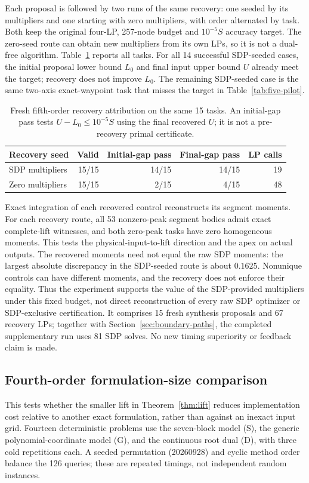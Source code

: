 \documentclass[pdflatex,sn-mathphys-num]{sn-jnl}
\theoremstyle{thmstyleone}
\theoremstyle{thmstyletwo}\newtheorem{remark}[theorem]{Remark}
\begin{document}
Each proposal is followed by two runs of the same recovery: one seeded by
its multipliers and one starting with zero multipliers, with order alternated
by task. Both keep the original four-LP, 257-node budget and
$10^{-5}S$ accuracy target. The zero-seed route can obtain new multipliers
from its own LPs, so it is not a dual-free algorithm.
Table~\ref{tab:five-attribution} reports all tasks. For all 14 successful
SDP-seeded cases, the initial proposal lower bound $L_0$ and final input
upper bound $U$ already meet the target; recovery does not improve $L_0$.
The remaining SDP-seeded case is the same two-axis exact-waypoint task
that misses the target in Table~\ref{tab:five-pilot}.
\begin{table}[htbp]
\centering\small
\caption{Fresh fifth-order recovery attribution on the same 15 tasks.
An initial-gap pass tests $U-L_0\le10^{-5}S$ using the final recovered $U$;
it is not a pre-recovery primal certificate.}
\label{tab:five-attribution}
\begin{tabular}{lrrrr}
\toprule
Recovery seed & Valid & Initial-gap pass & Final-gap pass & LP calls\\
\midrule
SDP multipliers &15/15&14/15&14/15&19\\
Zero multipliers &15/15&2/15&4/15&48\\
\bottomrule
\end{tabular}
\end{table}

Exact integration of each recovered control reconstructs its segment moments.
For each recovery route, all 53 nonzero-peak segment bodies admit exact
complete-lift witnesses, and both zero-peak tasks have zero homogeneous
moments. This tests the physical-input-to-lift direction and the apex on
actual outputs. The recovered moments need not equal the raw SDP moments:
the largest absolute discrepancy in the SDP-seeded route is about $0.1625$.
Nonunique controls can have different moments, and the recovery does not
enforce their equality. Thus the experiment supports the value of the
SDP-provided multipliers under this fixed budget, not direct reconstruction
of every raw SDP optimizer or SDP-exclusive certification. It comprises
15 fresh synthesis proposals and 67 recovery LPs; together with
Section~\ref{sec:boundary-paths}, the completed supplementary run uses 81 SDP
solves. No new timing superiority or feedback claim is made.

\subsection{Fourth-order formulation-size comparison}\label{sec:matched}
This tests whether the smaller lift in Theorem~\ref{thm:lift} reduces
implementation cost relative to another exact formulation, rather than
against an inexact input grid. Fourteen deterministic problems use the
seven-block model (S), the generic polynomial-coordinate model (G), and
the continuous root dual (D), with three cold repetitions each.
A seeded permutation (20260928) and cyclic method order balance the 126
queries; these are repeated timings, not independent random instances.
\end{document}
